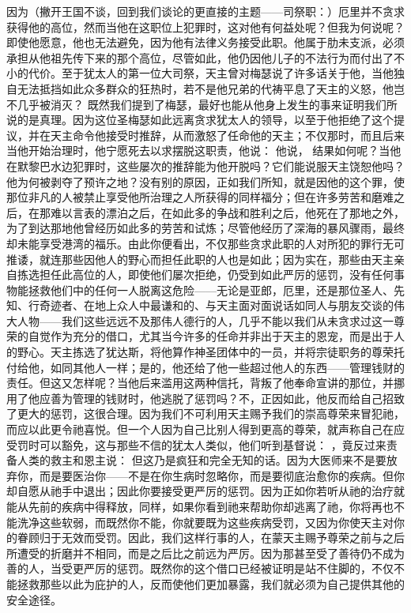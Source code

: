 因为（撇开王国不谈，回到我们谈论的更直接的主题——司祭职：）厄里并不贪求获得他的高位，然而当他在这职位上犯罪时，这对他有何益处呢？但我为何说呢？即使他愿意，他也无法避免，因为他有法律义务接受此职。他属于肋未支派，必须承担从他祖先传下来的那个高位，尽管如此，他仍因他儿子的不法行为而付出了不小的代价。至于犹太人的第一位大司祭，天主曾对梅瑟说了许多话关于他，当他独自无法抵挡如此众多群众的狂热时，若不是他兄弟的代祷平息了天主的义怒，他岂不几乎被消灭？ 既然我们提到了梅瑟，最好也能从他身上发生的事来证明我们所说的是真理。因为这位圣梅瑟如此远离贪求犹太人的领导，以至于他拒绝了这个提议，并在天主命令他接受时推辞，从而激怒了任命他的天主；不仅那时，而且后来当他开始治理时，他宁愿死去以求摆脱这职责，他说： 他说， 结果如何呢？当他在默黎巴水边犯罪时，这些屡次的推辞能为他开脱吗？它们能说服天主饶恕他吗？他为何被剥夺了预许之地？没有别的原因，正如我们所知，就是因他的这个罪，使那位非凡的人被禁止享受他所治理之人所获得的同样福分；但在许多劳苦和磨难之后，在那难以言表的漂泊之后，在如此多的争战和胜利之后，他死在了那地之外，为了到达那地他曾经历如此多的劳苦和试炼；尽管他经历了深海的暴风骤雨，最终却未能享受港湾的福乐。由此你便看出，不仅那些贪求此职的人对所犯的罪行无可推诿，就连那些因他人的野心而担任此职的人也是如此；因为实在，那些由天主亲自拣选担任此高位的人，即使他们屡次拒绝，仍受到如此严厉的惩罚，没有任何事物能拯救他们中的任何一人脱离这危险——无论是亚郎，厄里，还是那位圣人、先知、行奇迹者、在地上众人中最谦和的、与天主面对面说话如同人与朋友交谈的伟大人物——我们这些远远不及那伟人德行的人，几乎不能以我们从未贪求过这一尊荣的自觉作为充分的借口，尤其当今许多的任命并非出于天主的恩宠，而是出于人的野心。天主拣选了犹达斯，将他算作神圣团体中的一员，并将宗徒职务的尊荣托付给他，如同其他人一样；是的，他还给了他一些超过他人的东西——管理钱财的责任。但这又怎样呢？当他后来滥用这两种信托，背叛了他奉命宣讲的那位，并挪用了他应善为管理的钱财时，他逃脱了惩罚吗？不，正因如此，他反而给自己招致了更大的惩罚，这很合理。因为我们不可利用天主赐予我们的崇高尊荣来冒犯祂，而应以此更令祂喜悦。但一个人因为自己比别人得到更高的尊荣，就声称自己在应受罚时可以豁免，这与那些不信的犹太人类似，他们听到基督说： ，竟反过来责备人类的救主和恩主说： 但这乃是疯狂和完全无知的话。因为大医师来不是要放弃你，而是要医治你——不是在你生病时忽略你，而是要彻底治愈你的疾病。但你却自愿从祂手中退出；因此你要接受更严厉的惩罚。因为正如你若听从祂的治疗就能从先前的疾病中得释放，同样，如果你看到祂来帮助你却逃离了祂，你将再也不能洗净这些软弱，而既然你不能，你就要既为这些疾病受罚，又因为你使天主对你的眷顾归于无效而受罚。因此，我们这样行事的人，在蒙天主赐予尊荣之前与之后所遭受的折磨并不相同，而是之后比之前远为严厉。因为那甚至受了善待仍不成为善的人，当受更严厉的惩罚。既然你的这个借口已经被证明是站不住脚的，不仅不能拯救那些以此为庇护的人，反而使他们更加暴露，我们就必须为自己提供其他的安全途径。\par


